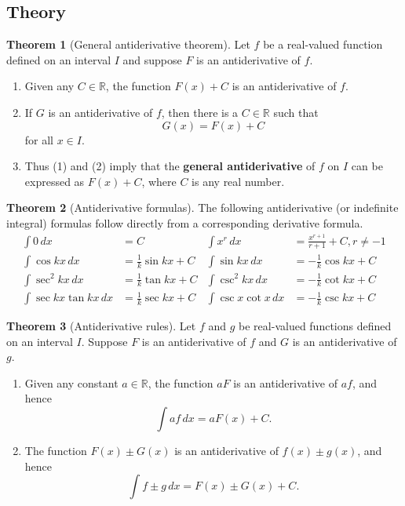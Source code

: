 \documentclass[11pt]{article}
\theoremstyle{definition}
\theoremstyle{named}
\newtheorem*{namedtheorem}{Theorem}
\numberwithin{myalgctr}{section}
\begin{document}
 \subsection*{Theory}
\begin{namedtheorem}[General antiderivative theorem] Let $f$ be a real-valued function defined on an interval $I$ and suppose $F$ is an antiderivative of $f$.
  \begin{enumerate}[itemsep=0pt, topsep=0pt]
    \item Given any $C\in \mathbb{R}$, the function $F(x)+C$ is an antiderivative of $f$.
    \item If $G$ is an antiderivative of $f$, then there is a $C\in \mathbb{R}$ such that
    \[
    G(x)=F(x)+C
    \]
    for all $x\in I$.
    \item Thus (1) and (2) imply that the {\bf general antiderivative} of $f$ on $I$ can be expressed as $F(x)+C$, where $C$ is any real number.
  \end{enumerate}

\end{namedtheorem}
\begin{namedtheorem}[Antiderivative formulas] The following antiderivative (or indefinite integral) formulas follow directly from a corresponding derivative formula.
  \begin{align*}
    \int 0\, dx&=C & \int x^r\, dx&=\frac{x^{r+1}}{r+1}+C, r\ne -1\\
    \int \cos kx\, dx&=\frac{1}{k}\sin kx+C & \int \sin kx\, dx &=-\frac{1}{k}\cos kx+C \\
    \int\sec^2kx\, dx&=\frac{1}{k}\tan kx+C & \int \csc^2 kx \, dx&=-\frac{1}{k}\cot kx+C\\
    \int \sec kx\tan kx\, dx&=\frac{1}{k}\sec kx+C & \int \csc x\cot x\, dx&=-\frac{1}{k}\csc kx+C
  \end{align*}
\end{namedtheorem}
\begin{namedtheorem}[Antiderivative rules] Let $f$ and $g$ be real-valued functions defined on an interval $I$. Suppose $F$ is an antiderivative of $f$ and $G$ is an antiderivative of $g$.
  \begin{enumerate}[itemsep=0pt, topsep=0pt]
    \item Given any constant $a\in \mathbb{R}$, the function $aF$ is an antiderivative of $af$, and hence
    \[
    \int af\, dx=aF(x)+C.
    \]
    \item The function $F(x)\pm G(x)$ is an antiderivative of $f(x)\pm g(x)$, and hence
    \[
    \int f\pm g\, dx=F(x)\pm G(x)+C.
    \]
  \end{enumerate}

\end{namedtheorem}
\end{document}
